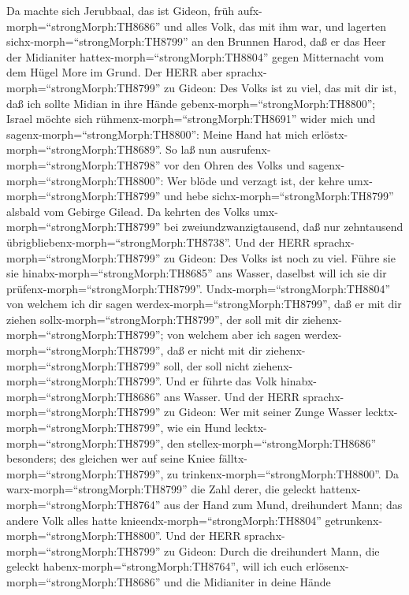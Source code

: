  Da machte sich Jerubbaal, das ist Gideon, früh
aufx-morph=``strongMorph:TH8686'' und alles Volk, das mit ihm war, und
lagerten sichx-morph=``strongMorph:TH8799'' an den Brunnen Harod, daß er
das Heer der Midianiter hattex-morph=``strongMorph:TH8804'' gegen
Mitternacht vom dem Hügel More im Grund.  Der HERR aber
sprachx-morph=``strongMorph:TH8799'' zu Gideon: Des Volks ist zu viel,
das mit dir ist, daß ich sollte Midian in ihre Hände
gebenx-morph=``strongMorph:TH8800''; Israel möchte sich
rühmenx-morph=``strongMorph:TH8691'' wider mich und
sagenx-morph=``strongMorph:TH8800'': Meine Hand hat mich
erlöstx-morph=``strongMorph:TH8689''.  So laß nun
ausrufenx-morph=``strongMorph:TH8798'' vor den Ohren des Volks und
sagenx-morph=``strongMorph:TH8800'': Wer blöde und verzagt ist, der
kehre umx-morph=``strongMorph:TH8799'' und hebe
sichx-morph=``strongMorph:TH8799'' alsbald vom Gebirge Gilead. Da
kehrten des Volks umx-morph=``strongMorph:TH8799'' bei
zweiundzwanzigtausend, daß nur zehntausend
übrigbliebenx-morph=``strongMorph:TH8738''.  Und der HERR
sprachx-morph=``strongMorph:TH8799'' zu Gideon: Des Volks ist noch zu
viel. Führe sie sie hinabx-morph=``strongMorph:TH8685'' ans Wasser,
daselbst will ich sie dir prüfenx-morph=``strongMorph:TH8799''.
Undx-morph=``strongMorph:TH8804'' von welchem ich dir sagen
werdex-morph=``strongMorph:TH8799'', daß er mit dir ziehen
sollx-morph=``strongMorph:TH8799'', der soll mit dir
ziehenx-morph=``strongMorph:TH8799''; von welchem aber ich sagen
werdex-morph=``strongMorph:TH8799'', daß er nicht mit dir
ziehenx-morph=``strongMorph:TH8799'' soll, der soll nicht
ziehenx-morph=``strongMorph:TH8799''.  Und er führte das
Volk hinabx-morph=``strongMorph:TH8686'' ans Wasser. Und der HERR
sprachx-morph=``strongMorph:TH8799'' zu Gideon: Wer mit seiner Zunge
Wasser lecktx-morph=``strongMorph:TH8799'', wie ein Hund
lecktx-morph=``strongMorph:TH8799'', den
stellex-morph=``strongMorph:TH8686'' besonders; des gleichen wer auf
seine Kniee fälltx-morph=``strongMorph:TH8799'', zu
trinkenx-morph=``strongMorph:TH8800''.  Da
warx-morph=``strongMorph:TH8799'' die Zahl derer, die geleckt
hattenx-morph=``strongMorph:TH8764'' aus der Hand zum Mund, dreihundert
Mann; das andere Volk alles hatte knieendx-morph=``strongMorph:TH8804''
getrunkenx-morph=``strongMorph:TH8800''.  Und der HERR
sprachx-morph=``strongMorph:TH8799'' zu Gideon: Durch die dreihundert
Mann, die geleckt habenx-morph=``strongMorph:TH8764'', will ich euch
erlösenx-morph=``strongMorph:TH8686'' und die Midianiter in deine Hände
